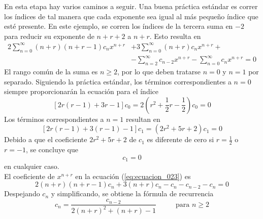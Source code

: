 En esta etapa hay varios caminos a seguir. Una buena práctica estándar es correr los índices de tal manera que cada exponente sea igual al más pequeño índice que esté presente. En este ejemplo, se corren los índices de la tercera suma en $-2$ para reducir su exponente de $n + r + 2$ a $n + r$. Esto resulta en
\begin{equation}
\begin{aligned}
2 \sum_{n=0}^{\infty}(n+r)(n+r-1) c_{n} x^{n+r} &+ 3 \sum_{n=0}^{\infty}(n+r) c_{n} x^{n+r} + \\
&- \sum_{n=2}^{\infty} c_{n-2} x^{n+r} - \sum_{n=0}^{\infty} c_{n} x^{n+r} = 0
\end{aligned}
\label{eq:ecuacion_023}
\end{equation}
El rango común de la suma es $n \geq 2$, por lo que deben tratarse $n = 0$ y $n = 1$ por separado. Siguiendo la práctica estándar, los términos correspondientes a $n = 0$ siempre proporcionarán la ecuación para el índice
\[ [2r (r-1) + 3r - 1] c_{0} = 2 (r^{2} + \frac{1}{2} r - \frac{1}{2} ) c_{0} = 0\]
Los términos correspondientes a $n=1$ resultan en
\[ [2r (r-1) + 3(r - 1) -1 ] c_{1} = (2 r^{2} + 5 r + 2 ) c_{1} = 0\]
Debido a que el coeficiente $2r^{2} + 5r + 2$ de $c_{1}$ es diferente de cero si $r = \frac{1}{2}$ o $r=-1$, se concluye que
\begin{equation}
c_{1} = 0
\label{eq:ecuacion_024}
\end{equation}
en cualquier caso.
\\
El coeficiente de $x^{n+r}$ en la ecuación (\ref{eq:ecuacion_023}) es
\[ 2(n+r)(n+r-1) c_{n} + 3(n+r) c_{n} - c_{n} - c_{n-2} - c_{n} = 0 \]
Despejando $c_{n}$ y simplificando, se obtiene la fórmula de recurrencia
\begin{equation}
c_{n} = \dfrac{c_{n-2}}{2(n+r)^{2} + (n+r) - 1} \hspace{1cm} \mbox{ para } n \geq 2
\label{eq:ecuacion_025}
\end{equation}
